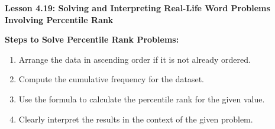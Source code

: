 \begin{center}
\textbf{Lesson 4.19: Solving and Interpreting Real-Life Word Problems Involving Percentile Rank}
\end{center}

\vspace*{-1.5ex}

\noindent\textbf{Steps to Solve Percentile Rank Problems:}  
\begin{enumerate}
    \item Arrange the data in ascending order if it is not already ordered.  
    \item Compute the cumulative frequency for the dataset.  
    \item Use the formula to calculate the percentile rank for the given value.  
    \item Clearly interpret the results in the context of the given problem.  
\end{enumerate}
